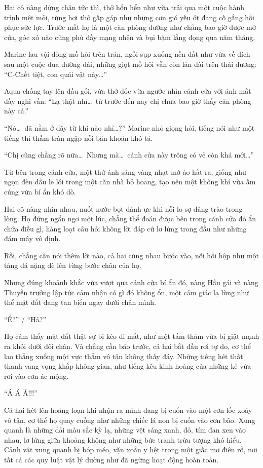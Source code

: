 \documentclass[../main.tex]{subfiles}
\begin{document}
Hai cô nàng dừng chân tức thì, thở hổn hển như vừa trải qua một cuộc hành trình mệt mỏi, từng hơi thở gấp gáp như những cơn gió yếu ớt đang cố gắng hồi phục sức lực. Trước mắt họ là một căn phòng dường như chẳng bao giờ được mở cửa, góc xó nào cũng phủ đầy mạng nhện và bụi bặm lắng đọng qua năm tháng.

Marine lau vội dòng mồ hôi trên trán, ngồi sụp xuống nền đất như vừa về đích sau một cuộc đua đường dài, những giọt mồ hôi vẫn còn lăn dài trên thái dương: ``C-Chết tiệt, con quái vật này\dots''

Aqua chống tay lên đầu gối, vừa thở dốc vừa ngước nhìn cánh cửa với ánh mắt đầy nghi vấn: ``Lạ thật nhỉ\dots\ từ trước đến nay chị chưa bao giờ thấy căn phòng này cả.''

``Nó\dots\ đã nằm ở đây từ khi nào nhỉ\dots?'' Marine nhỏ giọng hỏi, tiếng nói như một tiếng thì thầm tràn ngập nỗi băn khoăn khó tả.

``Chị cũng chẳng rõ nữa\dots\ Nhưng mà\dots\ cánh cửa này trông có vẻ còn khá mới\dots''

Từ bên trong cánh cửa, một thứ ánh sáng vàng nhạt mờ ảo hắt ra, giống như ngọn đèn dầu le lói trong một căn nhà bỏ hoang, tạo nên một không khí vừa ấm cúng vừa bí ẩn khó dò.

Hai cô nàng nhìn nhau, nuốt nước bọt đánh ực khi nỗi lo sợ dâng trào trong lòng. Họ đứng ngẩn ngơ một lúc, chẳng thể đoán được bên trong cánh cửa đó ẩn chứa điều gì, hàng loạt câu hỏi không lời đáp cứ lơ lửng trong đầu như những đám mây vô định.

Rồi, chẳng cần nói thêm lời nào, cả hai cùng nhau bước vào, nỗi hồi hộp như một tảng đá nặng đè lên từng bước chân của họ.

Nhưng đúng khoảnh khắc vừa vượt qua cánh cửa bí ẩn đó, nàng Hầu gái và nàng Thuyền trưởng lập tức cảm nhận có gì đó không ổn, một cảm giác lạ lùng như thể mặt đất đang tan biến ngay dưới chân mình.

``Ể?'' / ``Hả?''

Họ cảm thấy mặt đất thật sự bị kéo đi mất, như một tấm thảm vừa bị giật mạnh ra khỏi dưới đôi chân. Và chẳng cần báo trước, cả hai bắt đầu rơi tự do, cơ thể lao thẳng xuống một vực thẳm vô tận không thấy đáy. Những tiếng hét thất thanh vang vọng khắp không gian, như tiếng kêu kinh hoàng của những kẻ vừa rơi vào cơn ác mộng.

``Á Á Á!!!''


Cả hai hét lên hoảng loạn khi nhận ra mình đang bị cuốn vào một cơn lốc xoáy vô tận, cơ thể họ quay cuồng như những chiếc lá non bị cuốn vào cơn bão. Xung quanh là những dải màu sắc kỳ lạ, những vệt sáng xanh, đỏ, tím đan xen vào nhau, lơ lửng giữa khoảng không như những bức tranh trừu tượng khó hiểu. Cảnh vật xung quanh bị bóp méo, vặn xoắn y hệt trong một giấc mơ điên rồ, nơi tất cả các quy luật vật lý dường như đã ngừng hoạt động hoàn toàn.
\end{document}
